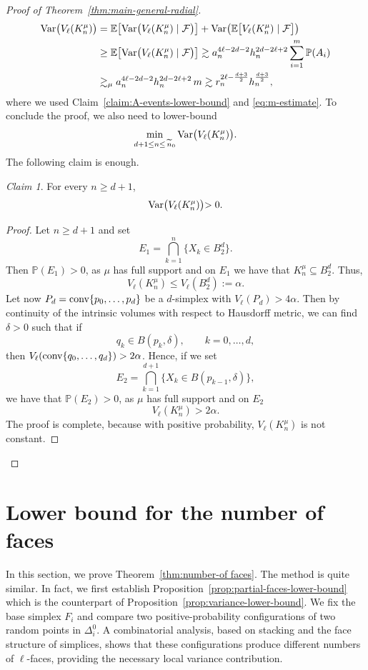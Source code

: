 \documentclass[10pt]{amsart}
\newcommand{\1}{\textbf{1}}
\newcommand{\conv}{{\rm conv}}
\newcommand{\Var}{{\rm Var}}
\numberwithin{equation}{section} %
\theoremstyle{remark}
\newtheorem{claim}{Claim}
\theoremstyle{definition}
\begin{document}
\begin{proof}[Proof of Theorem~\ref{thm:main-general-radial}]
\begin{align*}
    \Var\bigl(V_\ell(K_n^\mu)\bigr)&= \mathbb{E}\bigl[\Var\bigl(V_\ell(K_n^\mu)\mid \mathcal{F}\bigr)\bigr]+ \Var\bigl(\mathbb{E}\bigl[V_\ell(K_n^\mu)\mid\mathcal{F}\bigr]\bigr)\\
    &\geq \mathbb{E}\bigl[\Var\bigl(V_\ell(K_n^\mu)\mid \mathcal{F}\bigl)\bigr]\gtrsim a_n^{4\ell-2d-2}h_n^{2d-2\ell+2} \sum_{i=1}^{m}\mathbb{P}(A_i)\\
    &\gtrsim_\mu a_n^{4\ell-2d-2}h_n^{2d-2\ell+2}\,m \gtrsim  r_n^{2\ell-\frac{d+3}{2}}h_n^{\frac{d+3}{2}},
\end{align*}
    where we used Claim~\ref{claim:A-events-lower-bound} and \eqref{eq:m-estimate}. To conclude the proof, we also need to lower-bound \[\min_{d+1 \leq n \leq\,\widetilde{n}_0} \Var\bigl(V_\ell(K_n^\mu)\bigl).\] The following claim is enough.
    \begin{claim}
        For every $n \geq d+1$, \[\Var\bigl(V_\ell(K_n^\mu)\bigl)>0.\]
    \end{claim}

    \begin{proof}
        Let $ n \geq d+1$ and set \[E_1=\bigcap_{k=1}^{n}\big\{X_k \in B_2^d\big\}.\] Then $\mathbb{P}(E_1)>0$, as $\mu$ has full support and on $E_1$ we have that $K_n^\mu \subseteq B_2^d$. Thus, \[V_\ell(K_n^\mu) \leq V_\ell(B_2^d):=\alpha.\] Let now $P_d=\conv\{p_0,\ldots,p_d\}$ be a $d$-simplex with $V_\ell(P_d)>4\alpha.$ Then by continuity of the intrinsic volumes with respect to Hausdorff metric, we can find $\delta>0$ such that if \[q_k \in B(p_k,\delta),\quad\quad k=0,\ldots,d ,\] then $V_\ell(\conv\{q_0,\ldots,q_d\})>2\alpha$. Hence, if we set \[E_2=\bigcap_{k=1}^{d+1}\big\{X_k \in B(p_{k-1},\delta)\big\},\] we have that $\mathbb{P}(E_2)>0$, as $\mu$ has full support and on $E_2$ \[V_\ell(K_n^\mu)>2\alpha.\] The proof is complete, because with positive probability, $V_\ell(K_n^\mu)$ is not constant.
    \end{proof}
\end{proof}


\section{Lower bound for the number of faces}

In this section, we prove Theorem~\ref{thm:number-of faces}. The method is quite similar. In fact, we first establish Proposition~\ref{prop:partial-faces-lower-bound} which is the counterpart of Proposition~\ref{prop:variance-lower-bound}. We fix the base simplex $F_i$ and compare two positive-probability configurations of two random points in $\Delta_i^0$. A combinatorial analysis, based on stacking and the face structure of simplices, shows that these configurations produce different numbers of $\ell$-faces, providing the necessary local variance contribution.
\end{document}
